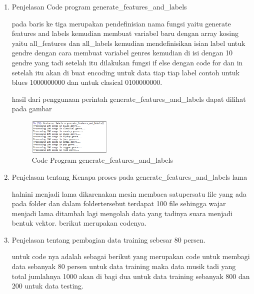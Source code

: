 \begin{enumerate}
            
            \item Penjelasan Code program  generate\_features\_and\_labels
            
            
            
            \subitem pada baris ke tiga merupakan pendefinisian nama fungsi yaitu generate features and labels kemudian membuat variabel baru dengan array kosing yaitu all\_features dan all\_labels kemudian mendefinisikan isian label untuk gendre dengan cara membuat variabel genres kemudian di isi dengan 10 gendre yang tadi setelah itu dilakukan fungsi if else dengan code for dan in setelah itu akan di buat encoding untuk data tiap tiap label contoh untuk blues 1000000000 dan untuk clasical 0100000000.
            
            \subitem hasil dari penggunaan perintah generate\_features\_and\_labels dapat dilihat pada gambar
            
            \begin{figure}[H]
                \includegraphics[width=4cm]{figures/1174095/tugas6/3.png}
                \centering
                  \caption{Code Program generate\_features\_and\_labels}
            \end{figure}
            
            \item Penjelasan tentang Kenapa proses pada generate\_features\_and\_labels lama
            
            
            
            \subitem halnini menjadi lama dikarenakan mesin membaca satupersatu file yang ada pada folder dan dalam foldertersebut terdapat 100 file sehingga wajar menjadi lama ditambah lagi mengolah data yang tadinya suara menjadi bentuk vektor. berikut merupakan codenya.
            
            \item Penjelasan tentang pembagian data training sebesar 80 persen.
            
            
            
            \subitem untuk code nya adalah sebagai berikut  yang merupakan code untuk membagi data sebanyak 80 persen untuk data training maka data musik tadi yang total jumlahnya 1000 akan di bagi dua untuk data training sebanyak 800  dan 200 untuk data testing.
            

\end{enumerate}
